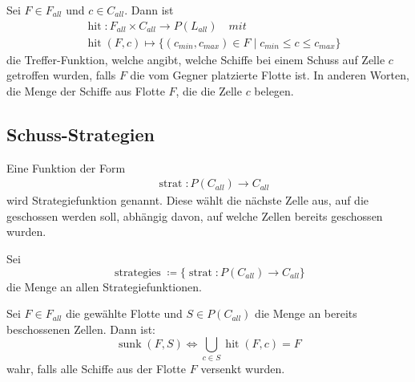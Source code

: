\documentclass[a4paper,12pt]{llncs}
\numberwithin{equation}{section}
\DeclareMathOperator{\hit}{hit}
\DeclareMathOperator{\strat}{strat}
\DeclareMathOperator{\strategies}{strategies}
\DeclareMathOperator{\sunk}{sunk}
\begin{document}
\begin{definition}
Sei $F \in F_{all}$ und $c \in C_{all}$.
Dann ist 
\begin{align}
&\hit:F_{all} \times C_{all} \rightarrow P(L_{all}) \quad mit \nonumber\\
&\hit(F, c)\mapsto \{(c_{min}, c_{max}) \in F \mid c_{min} \leq c \leq c_{max}\} \nonumber
\end{align}
die Treffer-Funktion, welche angibt, welche Schiffe bei einem Schuss auf Zelle $c$ getroffen wurden, falls $F$ die vom Gegner platzierte Flotte ist. In anderen Worten, die Menge der Schiffe aus Flotte $F$, die die Zelle $c$ belegen.
\end{definition}

\subsection{Schuss-Strategien}

\begin{definition}
Eine Funktion der Form
\begin{align}
&\strat:P(C_{all}) \rightarrow C_{all} \nonumber
\end{align}
wird Strategiefunktion genannt. Diese wählt die nächste Zelle aus, auf die geschossen werden soll, abhängig davon, auf welche Zellen bereits geschossen wurden.
\end{definition}

\begin{definition}
Sei
\[
\strategies  \coloneqq \{ \strat:P(C_{all}) \rightarrow C_{all} \}
\]
die Menge an allen Strategiefunktionen.
\end{definition}

\begin{definition}
Sei $F\in F_{all}$ die gewählte Flotte und $S \in P(C_{all})$ die Menge an bereits beschossenen Zellen.
Dann ist:
\[
\sunk(F, S) \Leftrightarrow \bigcup_{c \in S} \hit(F, c) = F
\]
wahr, falls alle Schiffe aus der Flotte $F$ versenkt wurden.
\end{definition}
\end{document}
